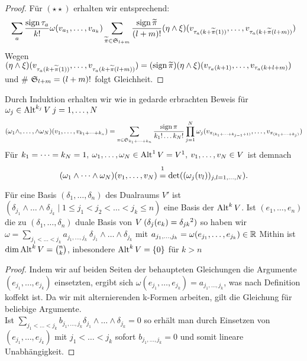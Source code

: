 \documentclass[skript.tex]{subfiles}
\begin{document}
\begin{proof}
		Für $(\star \star)$ erhalten wir entsprechend:
		\begin{equation*}
		\sum_a \frac{\operatorname{sign} \tau_a}{k!} \omega(v_{a_1}, \dots, v_{a_k})\sum_{\widetilde{\pi} \in \mathfrak{S}_{l+m}} \frac{\operatorname{sign} \widetilde{\pi}}{(l+m)!} (\eta \wedge \xi)(v_{\tau_a(k+\widetilde{\pi}(1))}, \dots, v_{\tau_a(k+\widetilde{\pi}(l+m))})
		\end{equation*}
		Wegen $(\eta \wedge \xi)(v_{\tau_a(k+\widetilde{\pi}(1))}, \dots, v_{\tau_a(k+\widetilde{\pi}(l+m))}) = (\operatorname{sign} \widetilde{\pi})(\eta \wedge \xi)(v_{\tau_a(k+1)}, \dots, v_{\tau_a(k+l+m)})$ und  \# $\mathfrak{S}_{l+m} = (l+m)!$ folgt Gleichheit.
	\end{proof}
		\begin{bem}
			Durch Induktion erhalten wir wie in gedarde erbrachten Beweis für $\omega_j \in \operatorname{Alt}^{k_j} V \: j=1, \dots, N$
			\begin{equation*}
			(\omega_1 \wedge, \dots, \wedge \omega_N)(v_1, \dots, v_{k_1+ \dots + k_n}) = \sum_{\pi \in \mathfrak{S}_{k_1 + \dots + k_n}} \frac{\operatorname{sign} \pi}{k_1! \dots k_N!} \prod_{j=1}^{N} \omega_j(v_{\pi_{(k_1+ \dots + k_{j-1}+1)}}, \dots, v_{\pi_{(k_1+ \dots + k_j)}})
			\end{equation*}
			Für $k_1 = \dots = k_N = 1, \: \omega_1, \dots, \omega_N \in \operatorname{Alt}^1 V = V^1, \: v_1, \dots, v_N \in V$ ist demnach 
			\[
				(\omega_1 \wedge \dots \wedge \omega_N)(v_1, \dots, v_N) \overset{\footnotemark}{=} \det((\omega_j(v_l))_{j,l = 1, \dots,N}).
			\] 
		\end{bem}
		\begin{theorem}
			Für eine Basis $(\delta_1, \dots, \delta_n)$ des Dualraums $V'$ ist $(\delta_{j_1} \wedge \dots \wedge \delta_{j_k} \mid 1 \leq j_1 < j_2 < \dots < j_k \leq n)$ eine Basis der $\operatorname{Alt}^k V$. Ist $(e_1, \dots, e_n)$ die zu $( \delta_1, \dots, \delta_n)$ duale Basis von $V \:(\delta_j(e_k) = \delta_{jk} \footnotemark)$  so haben wir $\omega = \sum_{j_1 < \dots < j_k} a_{j_1, \dots, j_k} \: \delta_{j_1} \wedge \dots \wedge \delta_{j_k}$ mit $a_{j_1, \dots, j_k} = \omega(e_{j_1}, \dots, e_{j_k}) \in \mathbb{R}$ Mithin ist $\dim \operatorname{Alt}^k V = \binom{n}{k}$, inbesondere $\operatorname{Alt}^k V = \{0\}$ für $k > n$
		\end{theorem}
		\begin{proof}
			Indem wir auf beiden Seiten der behaupteten Gleichungen die Argumente $(e_{j_1}, \dots, e_{j_k})$ einsetzten, ergibt sich $\omega (e_{j_1}, \dots, e_{j_k}) = a_{j_1, \dots, j_k}$, was nach Definition koffekt ist. Da wir mit alternierenden k-Formen arbeiten, gilt die Gleichung für beliebige Argumente.\\ Ist $\sum_{j_1 < \dots < j_k} b_{j_1, \dots, j_k} \delta_{j_1} \wedge \dots \wedge \delta_{j_k} = 0$ so erhält man durch Einsetzen von $(e_{j_1}, \dots, e_{j_k})$ mit $j_1 < \dots < j_k$ sofort $b_{j_1, \dots, j_k} = 0$ und somit lineare Unabhängigkeit.
		\end{proof}
	
\end{document}
